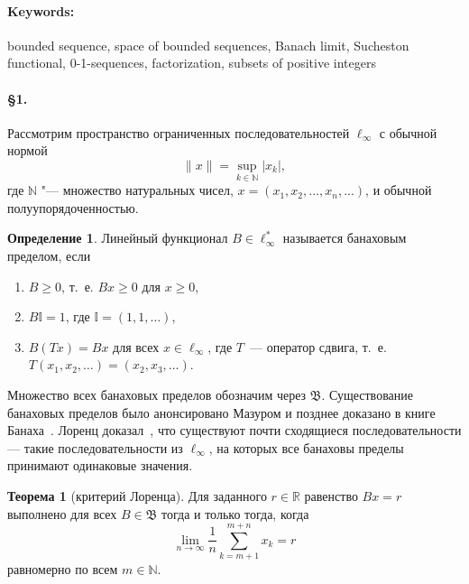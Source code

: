 \documentclass[a4paper,openbib]{article}
\theoremstyle{definition}
\newtheorem{theorem}[lemma]{Теорема}
\newtheorem{definition}{Определение}
\begin{document}
\paragraph{Keywords:}
	bounded sequence,
	space of bounded sequences,
	Banach limit,
	Sucheston functional,
	0-1-sequences,
	factorization,
	subsets of positive integers



\paragraph{\S 1.}

Рассмотрим пространство ограниченных последовательностей $\ell_\infty$ с обычной нормой
\begin{equation*}
	\|x\| = \sup_{k\in\mathbb{N}} |x_k|
	,
\end{equation*}
где $\mathbb{N}$ "--- множество натуральных чисел,
$x=(x_1, x_2, ..., x_n, ...)$,
и обычной полуупорядоченностью.


\begin{definition}
	Линейный функционал $B\in \ell_\infty^*$ называется банаховым пределом,
	если
	\begin{enumerate}[label=(\roman*)]
		\item
			$B\geqslant0$, т.~е. $Bx \geqslant 0$ для $x \geqslant 0$,
		\item
			$B\mathbb{I}=1$, где $\mathbb{I} =(1,1,\ldots)$,
		\item
			$B(Tx)=Bx$ для всех $x\in \ell_\infty$, где $T$~---
		оператор сдвига, т.~е. $T(x_1,x_2,\ldots)=(x_2,x_3,\ldots)$.
	\end{enumerate}
\end{definition}
Множество всех банаховых пределов обозначим через $\mathfrak{B}$.
Существование банаховых пределов было анонсировано Мазуром \cite{Mazur} и позднее доказано в книге Банаха~\cite{banach2001theory_rus}.
%
Лоренц доказал~\cite{lorentz1948contribution}, что существуют почти сходящиеся последовательности ---
такие последовательности из $\ell_\infty$,
на которых все банаховы пределы принимают одинаковые значения.
\begin{theorem}[критерий Лоренца]
	Для заданного $r\in\mathbb{R}$ равенство $Bx=r$ выполнено для всех $B\in\mathfrak{B}$
	тогда и только тогда, когда
	\begin{equation}
		\label{eq:crit_Lorentz}
		\lim_{n\to\infty} \frac{1}{n} \sum_{k=m+1}^{m+n} x_k = r
	\end{equation}
	равномерно по всем $m\in\mathbb{N}$.
\end{theorem}
\end{document}
